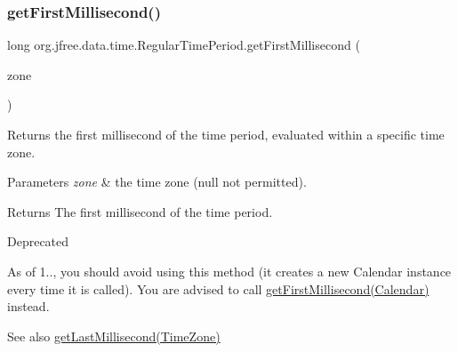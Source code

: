 \subsubsection{\texorpdfstring{get\+First\+Millisecond()}{getFirstMillisecond()}\hspace{0.1cm}{\footnotesize\ttfamily [2/3]}}
{\footnotesize\ttfamily long org.\+jfree.\+data.\+time.\+Regular\+Time\+Period.\+get\+First\+Millisecond (\begin{DoxyParamCaption}\item[{Time\+Zone}]{zone }\end{DoxyParamCaption})}

Returns the first millisecond of the time period, evaluated within a specific time zone.


\begin{DoxyParams}{Parameters}
{\em zone} & the time zone ({\ttfamily null} not permitted).\\
\hline
\end{DoxyParams}
\begin{DoxyReturn}{Returns}
The first millisecond of the time period.
\end{DoxyReturn}
\begin{DoxyRefDesc}{Deprecated}
\item[\mbox{\hyperlink{deprecated__deprecated000273}{Deprecated}}]As of 1.., you should avoid using this method (it creates a new Calendar instance every time it is called). You are advised to call \mbox{\hyperlink{classorg_1_1jfree_1_1data_1_1time_1_1_regular_time_period_a673bf019570d5e38eea9787c8e0ce42a}{get\+First\+Millisecond(\+Calendar)}} instead.\end{DoxyRefDesc}


\begin{DoxySeeAlso}{See also}
\mbox{\hyperlink{classorg_1_1jfree_1_1data_1_1time_1_1_regular_time_period_aaeb1a139a8046725c6827b0db023efd8}{get\+Last\+Millisecond(\+Time\+Zone)}} 
\end{DoxySeeAlso}
\mbox{\label{classorg_1_1jfree_1_1data_1_1time_1_1_regular_time_period_a673bf019570d5e38eea9787c8e0ce42a}} 
